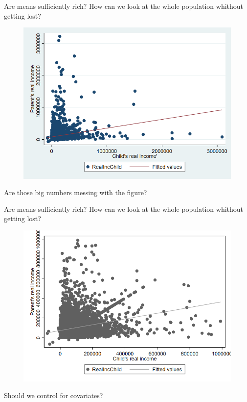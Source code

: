 \documentclass[10pt]{beamer}
\begin{document}
\begin{frame}{Are means sufficiently rich? How can we look at the whole population whithout getting lost?}

\begin{figure}[h!]
  \includegraphics[width=.6\textwidth]{LineFitScatter.png}
\end{figure}%

Are those big numbers messing with the figure?
    
\end{frame}

\begin{frame}{Are means sufficiently rich? How can we look at the whole population whithout getting lost?}

\begin{figure}[h!]
  \includegraphics[width=.8\textwidth]{LineFitScatter_Restrict.png}
\end{figure}%

Should we control for covariates?

\end{frame}
\end{document}
